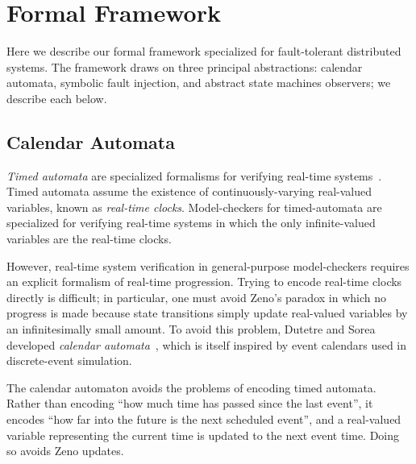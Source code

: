 \documentclass{llncs/llncs}
\begin{document}


\section{Formal Framework}\label{sec:model}
Here we describe our formal framework specialized for fault-tolerant distributed systems. The framework draws on three principal abstractions: calendar automata, symbolic fault injection, and abstract state machines observers; we describe each below.

\subsection{Calendar Automata}\label{sec:calendar}
\emph{Timed automata} are specialized formalisms for verifying real-time systems~\cite{alur}. Timed automata assume the existence of continuously-varying real-valued variables, known as \emph{real-time clocks}. Model-checkers for timed-automata are specialized for verifying real-time systems in which the only infinite-valued variables are the real-time clocks.

However, real-time system verification in general-purpose model-checkers requires an explicit formalism of real-time progression. Trying to encode real-time clocks directly is difficult; in particular, one must avoid Zeno's paradox in which no progress is made because state transitions simply update real-valued variables by an infinitesimally small amount. To avoid this problem, Dutetre and Sorea developed \emph{calendar automata}~\cite{cal}, which is itself inspired by event calendars used in discrete-event simulation.


The calendar automaton avoids the problems of encoding timed automata. Rather than encoding ``how much time has passed since the last event'', it encodes ``how far into the future is the next scheduled event'', and a real-valued variable representing the current time is updated to the next event time. Doing so avoids Zeno updates.
\end{document}
